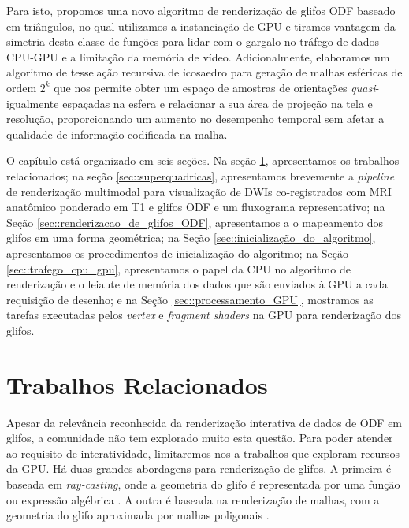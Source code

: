 Para isto, propomos uma novo algoritmo de renderização de glifos ODF baseado em triângulos, no qual utilizamos a instanciação de GPU e tiramos vantagem da simetria desta classe de funções para lidar com o gargalo no tráfego de dados CPU-GPU e a limitação da memória de vídeo. Adicionalmente, elaboramos um algoritmo de tesselação recursiva de icosaedro para geração de malhas esféricas de ordem $2^k$  que nos permite  obter um espaço de amostras de orientações \textit{quasi}-igualmente espaçadas na esfera e relacionar a sua área de projeção na tela e resolução, proporcionando um aumento no desempenho temporal sem afetar a qualidade de informação codificada na malha.


O capítulo está organizado em seis seções. Na seção \ref{sec::trabalhos_relacionados}, apresentamos os trabalhos relacionados; na seção \ref{sec::superquadricas}, apresentamos brevemente a \textit{pipeline} de renderização multimodal para visualização de DWIs co-registrados com MRI anatômico ponderado em T1 e glifos ODF e um fluxograma representativo; na Seção \ref{sec::renderizacao_de_glifos_ODF}, apresentamos a o mapeamento dos glifos em uma forma geométrica; na Seção \ref{sec::inicialização_do_algoritmo}, apresentamos os procedimentos de inicialização do algoritmo; na Seção \ref{sec::trafego_cpu_gpu}, apresentamos o papel da CPU no algoritmo de renderização e o leiaute de memória dos dados que são enviados à GPU a cada requisição de desenho; e na Seção \ref{sec::processamento_GPU}, mostramos as tarefas executadas pelos \textit{vertex} e \textit{fragment shaders} na GPU para renderização dos glifos.


\section{Trabalhos Relacionados}
\label{sec::trabalhos_relacionados}

Apesar da relevância reconhecida da renderização interativa de dados de ODF em glifos, a comunidade não tem explorado muito esta questão. Para poder atender ao requisito de interatividade, limitaremos-nos a trabalhos que exploram recursos da GPU. Há duas grandes abordagens para renderização de glifos. A primeira é baseada em \textit{ray-casting}, onde a geometria do glifo é representada por uma função ou expressão algébrica \cite{peeters2009, almsick2011}. A outra é baseada na renderização de malhas, com a geometria do glifo aproximada por malhas poligonais \cite{shattuck2008}.

